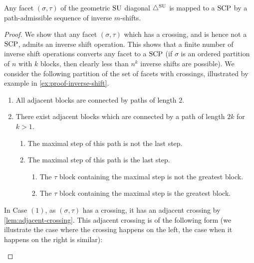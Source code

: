 \begin{lemma}
\label{lem:inverse-to-SCP}
Any facet $(\sigma,\tau)$ of the geometric $\mathrm{SU}$ diagonal $\triangle^{\mathrm{SU}}$ is mapped to a $\mathrm{SCP}$ by a path-admissible sequence of inverse $m$-shifts.
\end{lemma}

\begin{proof}
We show that any facet $(\sigma,\tau)$ which has a crossing, and is hence not a $\mathrm{SCP}$, admits an inverse shift operation. 
This shows that a finite number of inverse shift operations converts any facet to a $\mathrm{SCP}$ (if $\sigma$ is an ordered partition of $n$ with $k$ blocks, then clearly less than $n^k$ inverse shifts are possible).
We consider the following partition of the set of facets with crossings, illustrated by example in \cref{ex:proof-inverse-shift}.
\begin{enumerate}
	\item All adjacent blocks are connected by paths of length $2$.
	\item There exist adjacent blocks which are connected by a path of length $2k$ for $k>1$.
	\begin{enumerate}
		\item The maximal step of this path is not the last step.
		\item The maximal step of this path is the last step.
		\begin{enumerate}
			\item The $\tau$ block containing the maximal step is not the greatest block.
			\item The $\tau$ block containing the maximal step is the greatest block.
		\end{enumerate}
	\end{enumerate}
\end{enumerate}
In Case $(1)$, as $(\sigma,\tau)$ has a crossing, it has an adjacent crossing by \cref{lem:adjacent-crossing}. 
This adjacent crossing is of the following form (we illustrate the case where the crossing happens on the left, the case when it happens on the right is similar): 
\begin{center}
\end{center}
\end{proof}
